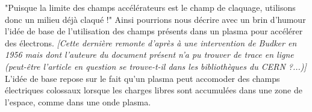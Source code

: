 \documentclass[a4paper]{book}
\begin{document}
"Puisque la limite des champs accélérateurs est le champ de claquage, utilisons donc un milieu déjà claqué !" Ainsi pourrions nous décrire avec un brin d'humour l'idée de base de l'utilisation des champs présents dans un plasma pour accélérer des électrons. \textit{[Cette dernière remonte d'après \cite{malka} à une intervention de Budker en 1956 \cite{budker} mais dont l'auteure du document présent n'a pu trouver de trace en ligne (peut-être l'article en question se trouve-t-il dans les bibliothèques du CERN ?...)]}  
L'idée de base repose sur le fait qu'un plasma peut accomoder des champs électriques colossaux lorsque les charges libres sont accumulées dans une zone de l'espace, comme dans une onde plasma. 


\medskip

\noindent{}\hfill
    
\end{document}
